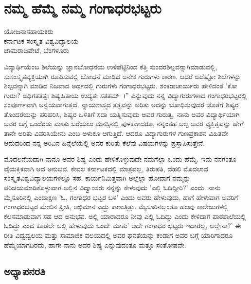 {\fontsize{14}{16}\selectfont
\chapter{ನಮ್ಮ ಹೆಮ್ಮೆ ನಮ್ಮ ಗಂಗಾಧರಭಟ್ಟರು}

\begin{center}
\smallskip
ಯೋಜನಾಸಹಾಯಕರು\\
ಕರ್ನಾಟಕ ಸಂಸ್ಕೃತ ವಿಶ್ವವಿದ್ಯಾಲಯ\\
ಚಾಮರಾಜಪೇಟೆ, ಬೆಂಗಳೂರು
\addrule
\end{center}

ವಿದ್ಯಾರ್ಥಿಯೆಂಬ ಶಿಲೆಯನ್ನು ಜ್ಞಾನಬೋಧನೆಯ ಉಳಿಪೆಟ್ಟಿನಿಂದ ಕೆತ್ತಿ ಸುಂದರಶಿಲ್ಪವನ್ನಾಗಿಮಾಡುವಲ್ಲಿ, ಸುಸಂಸ್ಕೃತವ್ಯಕ್ತಿಯಾಗಿ ರೂಪಿಸುವಲ್ಲಿ ಬೋಧನೆ ಮಾಡಿದ ಅನೇಕ ಗುರುಗಳು ಕಾರಣ. ಆದರೆ ಅದೆಷ್ಟೋ ಶಿಲೆಗಳನ್ನು ಶಿಲ್ಪವನ್ನಾಗಿ ಮಾಡಿದ ನಿಜವಾದ ಅರ್ಥದಲ್ಲಿ ಗುರುಗಳು ಗಂಗಾಧರಭಟ್ಟರು. ಶಂಕರಾಚಾರ್ಯರು ಹೇಳಿದಂತೆ ’ಕೋ ಗುರುಃ? ಅಧಿಗತತತ್ವಃ ಶಿಷ್ಯಹಿತಾಯ ಉದ್ಯತಃ ಸತತಮ್~।” ಎನ್ನುವುದು ನನ್ನ ವಿದ್ಯಾಗುರುಗಳಾದ ಗಂಗಾಧರಭಟ್ಟರಲ್ಲಿ ಸಂಪೂರ್ಣವಾಗಿ ಅನ್ವಯವಾಗುತ್ತದೆ. ನ್ಯಾಯಶಾಸ್ತ್ರದ ತತ್ವವನ್ನು ಅರಿತು ಅದನ್ನು ಬೋಧಿಸುವುದರ ಜೊತೆಗೆ ಶಿಷ್ಯರ ತೊಂದರೆಯನ್ನು ಪರಿಹರಿಸಿ, ಶಿಷ್ಯರ ಒಳಿತಿಗೆ ಸದಾ ಯತ್ನಿಸುವುದು ಅವರ ಗುರುತ್ವ. ನಾನು ಅವರ ವಿದ್ಯಾರ್ಥಿಯಾಗಿ ಅವರ ಬಗ್ಗೆ ಒಂದೆರಡು ಮಾತು ಬರೆಯಲು ಮನಸ್ಸಿನಲ್ಲಿ ಪುಳಕವಾದರೂ, ನನ್ನಂತಹ ಅಲ್ಪ ಅವರ ವ್ಯಕ್ತಿತ್ವವನ್ನು ಹೇಗೆ ತಾನೇ ಅರಿತು ವಿವರಿಸಿಯೇನು ಎಂಬ ಅಳುಕೂ ಆಗುತ್ತಿದೆ. ಆದರೂ ವಿದ್ಯಾಗುರುಗಳ ಗುಣಪ್ರಕಾಶನ ವಿಹಿತವೇ ಆದುದರಿಂದ ನನ್ನ ಅರಿವಿನ ಹಿನ್ನೆಲೆಯೆಲ್ಲಿ ಅವರ ಕುರಿತು ಕೆಲೆವು ವಿಷಯಗಳನ್ನು ಪ್ರಸ್ತಾಪಿಸುತ್ತೇನೆ.

ಮೊದಲನೆಯದಾಗಿ ನಾನೂ ಅವರ ಶಿಷ್ಯ ಎಂದು ಹೇಳಿಕೊಳ್ಳುವುದೇ ನಮಗೆಲ್ಲಾ ಒಂದು ಹೆಮ್ಮೆ. ಇದು ನನಗಂತೂ ವೈಯಕ್ತಿಕವಾಗಿ ಆದ ಅನುಭವ. ಕೇವಲ ಕರ್ನಾಟಕದಲ್ಲಿ ಮಾತ್ರವಲ್ಲ, ತಿರುಪತಿ, ದೆಹಲಿ ಮೊದಲಾದ ಸಂಸ್ಕೃತವಿಶ್ವವಿದ್ಯಾಲಯಗಳಲ್ಲೂ ಸಹ. ಕಾರ್ಯನಿಮಿತ್ತವಾಗಿ ಅಲ್ಲೆಲ್ಲಾ ಹೋದಾಗ ನಮ್ಮನ್ನು ಪರಿಚಯಮಾಡಿಕೊಳ್ಳುವಾಗ ಅಲ್ಲಿನ ವಿದ್ವಾಂಸರು ನನ್ನನ್ನು ಕೇಳುವುದು ’ಎಲ್ಲಿ ಓದಿದ್ದೀರಿ?’ ಎಂದು. ನಾನು ಮೈಸೂರಿನಲ್ಲಿ ಎಂದಾಕ್ಷಣ ’ಓ, ಗಂಗಾಧರ ಭಟ್ಟರ ಬಳಿ’ ಎಂದು ಅವರು ಹೇಳುವುದು, ಹಾಗೆ ಹೇಳುವಾಗ ಅವರಿಗೆ ಗಂಗಾಧರಭಟ್ಟರ ಮೇಲಿನ ಪ್ರೀತಿ, ಅಭಿಮಾನ ಎದ್ದು ಕಾಣುತ್ತಿತ್ತು. ಮೈಸೂರಿನಲ್ಲಂತೂ ಹಲವು ಕಾಲೇಜುಗಳಲ್ಲಿ ಕೆಲಸಮಾಡುವಾಗ ಸಹ ಆದ ಅನುಭವ. ಅಲ್ಲಿ ಯಾರಾದರೂ ನೀವು ಎಲ್ಲಿ ಓದಿದ್ದು ಎಂದು ಕೇಳಿದಾಗ ಪಾಠಶಾಲೆಯಲ್ಲಿ ಓದಿದ್ದು ಎಂದ ಕೂಡಲೇ ಅಲ್ಲಿ ಹೇಳುವುದು ಒಂದೇ ಮಾತು’ ಅದೇ ಗಂಗಾಧರ ಭಟ್ಟರು ಇದಾರಲ್ಲ, ಅಲ್ಲೇನಾ?’ ಈ ರೀತಿ ವಿದ್ವದ್ವಲಯ ಮತ್ತು ಸಾಮಾಜಿಕ ವಲಯದಲ್ಲಿ ಅವರ ಘನತೆಯನ್ನು ಕಂಡಾಗ ಅವರ ಬಗ್ಗೆ ಯಾರಿಗಾದರೂ ಹೆಮ್ಮೆಯಾಗದಿರದು, ಹಾಗೇ ನಾನು ಅವರ ಶಿಷ್ಯ ಎನ್ನುವುದಂತೂ ಮತ್ತೂ ಸಂತೋಷವೇ.

\section*{ಅಧ್ಯಾಪನರತಿ}

}
